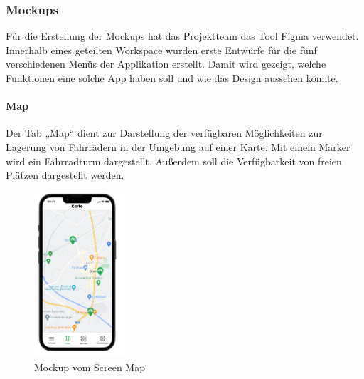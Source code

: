 \subsubsection{Mockups}
Für die Erstellung der Mockups hat das Projektteam das Tool Figma verwendet. Innerhalb eines geteilten Workspace wurden erste Entwürfe für die fünf verschiedenen Menüs der Applikation erstellt. Damit wird gezeigt, welche Funktionen eine solche App haben soll und wie das Design aussehen könnte.\\

\paragraph{Map}Der Tab „Map“ dient zur Darstellung der verfügbaren Möglichkeiten zur Lagerung von Fahrrädern in der Umgebung auf einer Karte. Mit einem Marker wird ein Fahrradturm dargestellt. Außerdem soll die Verfügbarkeit von freien Plätzen dargestellt werden.\\
\begin{figure}[ht]
  \centering
  \includegraphics[width=0.3\textwidth]{images/app_mock_map}
  \caption{Mockup vom Screen Map}
  \label{fig:screenmap}
\end{figure}


